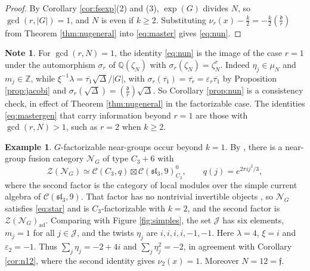 \documentclass[10pt]{article}
\theoremstyle{plain}
\theoremstyle{definition}
\newtheorem{note}[theorem]{Note}
\newtheorem{example}[theorem]{Example}
\theoremstyle{plain}
\newcommand{\Jac}[2]{\left(\tfrac{#1}{#2}\right)}
\begin{document}
\begin{proof}
By Corollary \ref{cor:fsexp}(2) and (3), $\exp(G)$ divides $N$, so $\gcd(r,|G|)=1$, and $N$ is even if $k\geq2$. Substituting $\nu_r(x)-\frac k2=-\frac k2\Jac{\mathfrak{d}}{r}$ from Theorem \ref{thm:nugeneral} into \eqref{eq:master} gives \eqref{eq:nun}.
\end{proof}

\begin{note}\label{rem:nunGalois}
For $\gcd(r,N)=1$, the identity \eqref{eq:nun} is the image of the case $r=1$ under the automorphism $\sigma_r$ of $\mathbb{Q}(\zeta_N)$ with $\sigma_r(\zeta_N)=\zeta_N^r$. Indeed $\eta_j\in\mu_N$ and $m_j\in\mathbb{Z}$, while $\xi^{-1}\lambda=\overline{\tau_1}\sqrt\Delta/|G|$, with $\sigma_r(\overline{\tau_1})=\overline{\tau_r}=\varepsilon_r\overline{\tau_1}$ by Proposition \ref{prop:jacobi} and $\sigma_r(\sqrt\Delta)=\Jac{\mathfrak{d}}{r}\sqrt\Delta$. So Corollary \ref{prop:nun} is a consistency check, in effect of Theorem \ref{thm:nugeneral} in the factorizable case. The identities \eqref{eq:mastergen} that carry information beyond $r=1$ are those with $\gcd(r,N)>1$, such as $r=2$ when $k\geq2$.
\end{note}

\begin{example}\label{ex:C3k2}
$G$-factorizable near-groups occur beyond $k=1$. By \cite[Theorem 3.6 and its proof]{yu2023center}, there is a near-group fusion category $\mathcal{N}_G$ of type $C_3+6$ with
\[
\mathcal{Z}(\mathcal{N}_G)\simeq\mathcal{C}(C_3,q)\boxtimes\mathcal{C}(\mathfrak{sl}_3,9)^0_{C_3},\qquad q(j)=e^{2\pi ij^2/3},
\]
where the second factor is the category of local modules over the simple current algebra of $\mathcal{C}(\mathfrak{sl}_3,9)$. That factor has no nontrivial invertible objects \cite[Lemma 3.1]{yu2023center}, so $\mathcal{N}_G$ satisfies \eqref{eq:star} and is $C_3$-factorizable with $k=2$, and the second factor is $\mathcal{Z}(\mathcal{N}_G)_\mathrm{ad}$. Comparing \cite[Lemmas 3.1 and 3.4]{yu2023center} with Figure \ref{fig:simples}, the set $\mathcal{J}$ has six elements, $m_j=1$ for all $j\in\mathcal{J}$, and the twists $\eta_j$ are $i,i,i,i,-1,-1$. Here $\lambda=4$, $\xi=i$ and $\varepsilon_2=-1$. Thus $\sum_j\eta_j=-2+4i$ and $\sum_j\eta_j^2=-2$, in agreement with Corollary \ref{cor:n12}, where the second identity gives $\nu_2(x)=1$. Moreover $N=12=\mathfrak{f}$.
\end{example}

\end{document}
